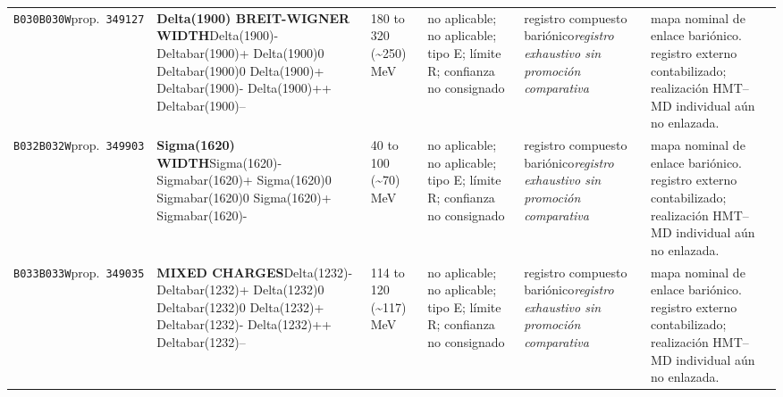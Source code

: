 \begin{landscape}
\begin{longtable}{L{1.85cm}L{4.45cm}L{2.35cm}L{4.05cm}L{3.35cm}L{7.15cm}}
\texttt{B030}\newline \texttt{B030W}\newline prop.\ \texttt{349127} & \textbf{Delta(1900) BREIT-WIGNER WIDTH}\newline Delta(1900)- \textbar{}\allowbreak{} Deltabar(1900)+ \textbar{}\allowbreak{} Delta(1900)0 \textbar{}\allowbreak{} Deltabar(1900)0 \textbar{}\allowbreak{} Delta(1900)+ \textbar{}\allowbreak{} Deltabar(1900)- \textbar{}\allowbreak{} Delta(1900)++ \textbar{}\allowbreak{} Deltabar(1900)-- & 180 to 320 (\textasciitilde{}250)\,MeV & no aplicable; no aplicable; tipo E; límite R; confianza no consignado & registro compuesto bariónico\newline \emph{registro exhaustivo sin promoción comparativa} & mapa nominal de enlace bariónico. registro externo contabilizado; realización HMT--MD individual aún no enlazada. \\
\texttt{B032}\newline \texttt{B032W}\newline prop.\ \texttt{349903} & \textbf{Sigma(1620) WIDTH}\newline Sigma(1620)- \textbar{}\allowbreak{} Sigmabar(1620)+ \textbar{}\allowbreak{} Sigma(1620)0 \textbar{}\allowbreak{} Sigmabar(1620)0 \textbar{}\allowbreak{} Sigma(1620)+ \textbar{}\allowbreak{} Sigmabar(1620)- & 40 to 100 (\textasciitilde{}70)\,MeV & no aplicable; no aplicable; tipo E; límite R; confianza no consignado & registro compuesto bariónico\newline \emph{registro exhaustivo sin promoción comparativa} & mapa nominal de enlace bariónico. registro externo contabilizado; realización HMT--MD individual aún no enlazada. \\
\texttt{B033}\newline \texttt{B033W}\newline prop.\ \texttt{349035} & \textbf{MIXED CHARGES}\newline Delta(1232)- \textbar{}\allowbreak{} Deltabar(1232)+ \textbar{}\allowbreak{} Delta(1232)0 \textbar{}\allowbreak{} Deltabar(1232)0 \textbar{}\allowbreak{} Delta(1232)+ \textbar{}\allowbreak{} Deltabar(1232)- \textbar{}\allowbreak{} Delta(1232)++ \textbar{}\allowbreak{} Deltabar(1232)-- & 114 to 120 (\textasciitilde{}117)\,MeV & no aplicable; no aplicable; tipo E; límite R; confianza no consignado & registro compuesto bariónico\newline \emph{registro exhaustivo sin promoción comparativa} & mapa nominal de enlace bariónico. registro externo contabilizado; realización HMT--MD individual aún no enlazada. \\

\end{longtable}
\end{landscape}
